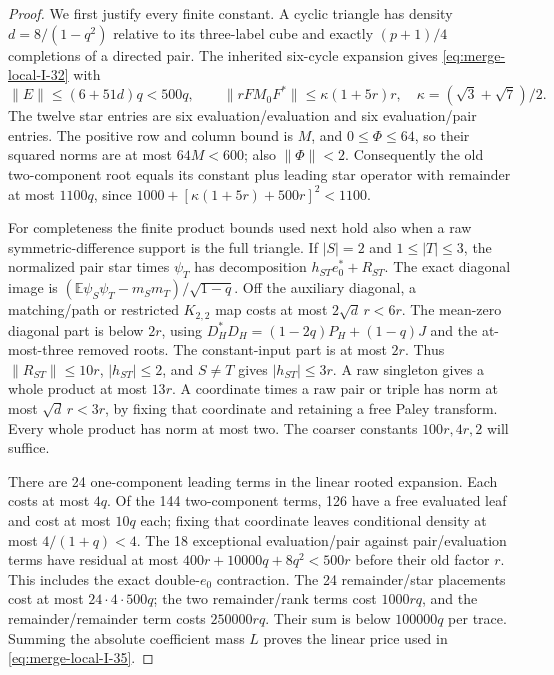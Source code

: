 \begin{proof}
We first justify every finite constant. A cyclic triangle has
density $d=8/(1-q^2)$ relative to its three-label cube and
exactly $(p+1)/4$ completions of a directed pair. The inherited
six-cycle expansion gives \eqref{eq:merge-local-I-32} with
\begin{equation}\label{eq:merge-local-I-39}
 \|E\|\le(6+51d)q<500q,\qquad
 \|rFM_0F^*\|\le\kappa(1+5r)r,\quad
 \kappa=(\sqrt3+\sqrt7)/2 .
\end{equation}
The twelve star entries are six evaluation/evaluation and six
evaluation/pair entries. The positive row and column bound
is $M$, and $0\le\Phi\le64$, so their squared norms are at
most $64M<600$; also $\|\Phi\|<2$.
Consequently the old two-component root equals its constant
plus leading star operator with remainder at most $1100q$,
since $1000+[\kappa(1+5r)+500r]^2<1100$.

For completeness the finite product bounds used next hold
also when a raw symmetric-difference support is the full
triangle. If $|S|=2$ and $1\le|T|\le3$, the normalized pair
star times $\psi_T$ has decomposition $h_{ST}e_0^*+R_{ST}$.
The exact diagonal image is
$(\mathbb E\psi_S\psi_T-m_Sm_T)/\sqrt{1-q}$.
Off the auxiliary diagonal, a matching/path or restricted
$K_{2,2}$ map costs at most $2\sqrt d\,r<6r$.
The mean-zero diagonal part is below $2r$, using
$D_H^*D_H=(1-2q)P_H+(1-q)J$ and the at-most-three removed
roots. The constant-input part is at most $2r$.
Thus $\|R_{ST}\|\le10r$, $|h_{ST}|\le2$, and
$S\ne T$ gives $|h_{ST}|\le3r$. A raw singleton gives a
whole product at most $13r$. A coordinate times a raw pair
or triple has norm at most $\sqrt d\,r<3r$, by fixing that
coordinate and retaining a free Paley transform.
Every whole product has norm at most two.
The coarser constants $100r,4r,2$ will suffice.

There are 24 one-component leading terms in the linear
rooted expansion. Each costs at most $4q$. Of the 144
two-component terms, 126 have a free evaluated leaf and cost
at most $10q$ each; fixing that coordinate leaves conditional
density at most $4/(1+q)<4$. The 18 exceptional
evaluation/pair against pair/evaluation terms have residual
at most $400r+10000q+8q^2<500r$ before their old factor $r$.
This includes the exact double-$e_0$ contraction. The 24
remainder/star placements cost at most $24\cdot4\cdot500q$;
the two remainder/rank terms cost $1000rq$, and the
remainder/remainder term costs $250000rq$. Their sum is
below $100000q$ per trace. Summing the absolute coefficient
mass $L$ proves the linear price used in \eqref{eq:merge-local-I-35}.


\end{proof}

